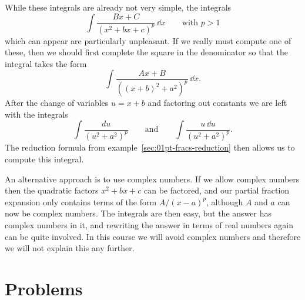 While these integrals are already not very simple, the integrals
\[
\int\frac {Bx+C}{(x^2+bx+c)^p}\,\dd x\qquad \text{with $p>1$}
\]
which can appear are particularly unpleasant.  If we really must compute one of
these, then we should first complete the square in the denominator so that the
integral takes the form
\[
\int \frac{Ax+B}{((x+b)^2+a^2)^p}\,\dd x.
\]
After the change of variables $u=x+b$ and factoring out constants we are left
with the integrals
\[
\int \frac{du}{(u^2+a^2)^p} \qquad \mbox{and}\qquad \int \frac{u\, \dd
  u}{(u^2+a^2)^p}.
\]
The reduction formula from example~\ref{sec:01pt-fracs-reduction} then allows us
to compute this integral.

An alternative approach is to use complex numbers.  If we allow complex numbers
then the quadratic factors $x^2+bx+c$ can be factored, and our partial fraction
expansion only contains terms of the form $A/ (x-a)^p$, although $A$ and $a$ can
now be complex numbers.  The integrals are then easy, but the answer has complex
numbers in it, and rewriting the answer in terms of real numbers again can be
quite involved.  In this course we will avoid complex numbers and therefore we
will not explain this any further.

\section{Problems} %


